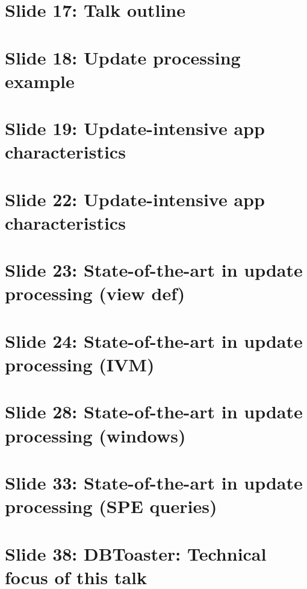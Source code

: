 \documentclass{article}
\begin{document}
\section{Slide 17: Talk outline}

\section{Slide 18: Update processing example}
\section{Slide 19: Update-intensive app characteristics}
\section{Slide 22: Update-intensive app characteristics}
\section{Slide 23: State-of-the-art in update processing (view def)}
\section{Slide 24: State-of-the-art in update processing (IVM)}
\section{Slide 28: State-of-the-art in update processing (windows)}
\section{Slide 33: State-of-the-art in update processing (SPE queries)}
\section{Slide 38: DBToaster: Technical focus of this talk}
\end{document}
